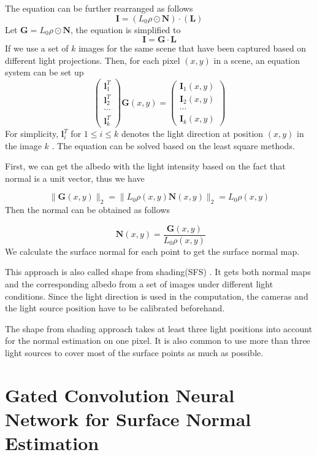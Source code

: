 The equation can be further rearranged as follows
\[ \textbf{I} =(L_0\rho \odot \textbf{N}) \cdot  ( \textbf{L}) \]
Let $ \textbf{G} =L_0\rho \odot \textbf{N} $, the equation is simplified to 
\[\textbf{I} = \textbf{G} \cdot \textbf{L}\]
If we use a set of $ k $ images for the same scene that have been captured based on different light projections. Then, for each pixel $ (x,y) $ in a scene, an equation system can be set up 
\[ 
\begin{pmatrix}
	\textbf{l}_1^T \\
	\textbf{l}_2^T \\
	\cdots \\
	\textbf{l}_k^T
\end{pmatrix} \textbf{G}(x,y) = 
\begin{pmatrix}
	\textbf{I}_1(x,y) \\
	\textbf{I}_2(x,y) \\
	\cdots \\
	\textbf{I}_k(x,y)
\end{pmatrix}
\]
For simplicity, $ \textbf{l}_i^T $ for $ 1\le i \le k $ denotes the light direction at position $ (x,y) $ in the image $ k $ . The equation can be solved based on the least square methods. 

First, we can get the albedo with the light intensity based on the fact that normal is a unit vector, thus we have 

\[ \|\textbf{G}(x,y)\|_2 = \|L_0\rho(x,y)\textbf{N}(x,y)\|_2 = L_0\rho(x,y) \]
Then the normal can be obtained as follows

\[ \textbf{ N}(x,y) = \frac{\textbf{G}(x,y)}{L_0\rho(x,y)}\]
We calculate the surface normal for each point to get the surface normal map. 

This approach is also called shape from shading(SFS) \cite{SFS}. It gets both normal maps and the corresponding albedo from a set of images under different light conditions. Since the light direction is used in the computation, the cameras and the light source position have to be calibrated beforehand. 

The shape from shading approach takes at least three light positions into account for the normal estimation on one pixel. It is also common to use more than three light sources to cover most of the surface points as much as possible. 

\newpage 
\section{Gated Convolution Neural Network for Surface Normal Estimation}
\label{sec:gcnn}

